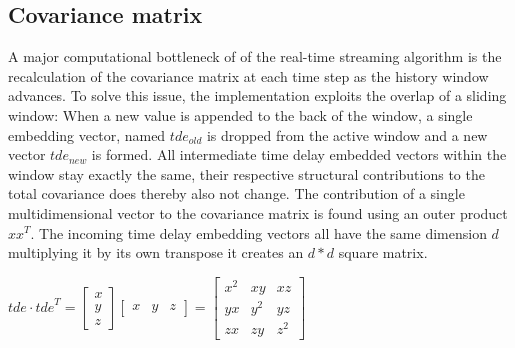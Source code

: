 \subsection{Covariance matrix}
A major computational bottleneck of of the real-time streaming algorithm is the recalculation of the covariance matrix at each time step as the history window advances.
To solve this issue, the implementation exploits the overlap of a sliding window: When a new value is appended to the back of the window, a single embedding vector, named $tde_{old}$ is dropped from the active window and a new vector $tde_{new}$ is formed. All intermediate time delay embedded vectors within the window stay exactly the same, their respective structural contributions to the total covariance does thereby also not change. 
The contribution of a single multidimensional vector to the covariance matrix is found using an outer product $x{x}^T$. The incoming time delay embedding vectors all have the same dimension $d$ multiplying it by its own transpose it creates an $d*d$ square matrix. \\
\begin{center}
    ${tde} \cdot {tde}^T = 
\begin{bmatrix} 
x \\ 
y \\ 
z 
\end{bmatrix}
\begin{bmatrix} 
x & y & z 
\end{bmatrix} 
= 
\begin{bmatrix} 
x^2 & xy & xz \\ 
yx & y^2 & yz \\ 
zx & zy & z^2 
\end{bmatrix}$
\end{center}

